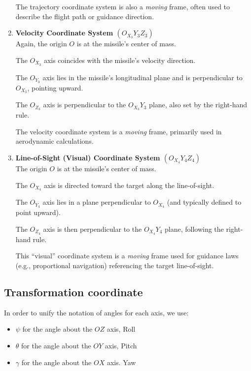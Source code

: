 \documentclass{article}
\begin{document}
\begin{enumerate}
  The trajectory coordinate system is also a \emph{moving} frame, often used to describe the flight path or guidance direction.
  
  \item \textbf{Velocity Coordinate System $(O_{X_3}Y_3Z_3)$}\\
  Again, the origin $O$ is at the missile’s center of mass.  
  
  The $O_{X_3}$ axis coincides with the missile’s velocity direction.  
  
  The $O_{Y_3}$ axis lies in the missile’s longitudinal plane and is perpendicular to $O_{X_3}$, pointing upward.  
  
  The $O_{Z_3}$ axis is perpendicular to the $O_{X_3}Y_3$ plane, also set by the right-hand rule.  
  
  The velocity coordinate system is a \emph{moving} frame, primarily used in aerodynamic calculations.
  
  \item \textbf{Line-of-Sight (Visual) Coordinate System $(O_{X_4}Y_4Z_4)$}\\
  The origin $O$ is at the missile’s center of mass.  
  
  The $O_{X_4}$ axis is directed toward the target along the line-of-sight.  
  
  The $O_{Y_4}$ axis lies in a plane perpendicular to $O_{X_4}$ (and typically defined to point upward).  
  
  The $O_{Z_4}$ axis is then perpendicular to the $O_{X_4}Y_4$ plane, following the right-hand rule.  
  
  This “visual” coordinate system is a \emph{moving} frame used for guidance laws (e.g., proportional navigation) referencing the target line-of-sight.
  \end{enumerate}


\newpage
\subsection{Transformation coordinate}


\justifying In order to unify the notation of angles for each axis, we use:
\begin{itemize}
  \item \(\psi\) for the angle about the \(OZ\) axis, Roll
  \item \(\theta\) for the angle about the \(OY\) axis, Pitch
  \item \(\gamma\) for the angle about the \(OX\) axis. Yaw
\end{itemize}
\end{document}
